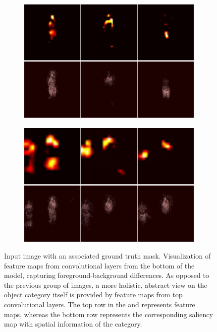\begin{figure}[t]
\begin{subfigure}[b]{0.13\textwidth}
        \caption[]{}
    \end{subfigure}
    \hfill
    \begin{subfigure}[b]{0.39\textwidth}
        \centering
        \includegraphics[width=\textwidth]{figures/theoretical_foundations/fully_cnn_tracking_feature_maps_2.pdf}
        \caption[]{}
    \end{subfigure}
    \hfill
    \begin{subfigure}[b]{0.39\textwidth}
        \centering
        \includegraphics[width=\textwidth]{figures/theoretical_foundations/fully_cnn_tracking_feature_maps_3.pdf}
        \caption[]{}
    \end{subfigure}
    \caption[Fully convolutional tracking]{ Input image with an associated ground truth mask.  Visualization of feature maps from convolutional layers from the bottom of the model, capturing foreground-background differences.  As opposed to the previous group of images, a more holistic, abstract view on the object category itself is provided by feature maps from top convolutional layers. The top row in the  and  represents feature maps, whereas the bottom row represents the corresponding saliency map with spatial information of the category. }
    \label{fig:FullyCNNTrackingFeatureMaps}
\end{figure}

